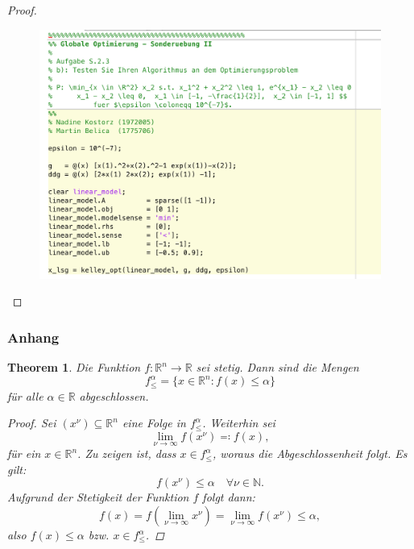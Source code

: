 \documentclass[12pt]{extreport} %
\newcommand{\N}{\mathbb{N}}
\newcommand{\R}{\mathbb{R}}
\theoremstyle{named}
\theoremstyle{nnamed}
\theoremstyle{itshape}
\theoremstyle{normal}
\newtheorem*{theorem}{Theorem}
\begin{document}
\begin{enumerate}
\begin{proof}
			\begin{figure}[h!] \centering \includegraphics[scale=0.51]{img/scr} \label{fig:sub2}\end{figure} 
		\end{proof}
\end{enumerate} 

\newpage

\subsubsection{Anhang}
 

\begin{theorem}
 	 Die Funktion $f \colon \R^n \rightarrow \R$ sei stetig. Dann sind die Mengen 
 	 	$$ f^\alpha_\leq = \{ x \in \R^n \colon f(x) \leq \alpha\} $$
 	 für alle $\alpha \in \R$ abgeschlossen.
 	 
	\begin{proof}
 		Sei $(x^\nu) \subseteq \R^n$ eine Folge in $f_\leq^\alpha$. Weiterhin sei
 			$$ \lim_{\nu \rightarrow \infty} f(x^\nu) \eqqcolon f(x), $$
 			für ein $x \in \R^n$. Zu zeigen ist, dass $x \in f_\leq^\alpha$, woraus die Abgeschlossenheit folgt. Es gilt:
 			$$ f(x^\nu) \leq \alpha \quad \forall \nu \in \N. $$
 		Aufgrund der Stetigkeit der Funktion $f$ folgt dann:
 			$$ f(x) = f(\lim_{\nu \rightarrow \infty} x^\nu) = \lim_{\nu \rightarrow \infty} f(x^\nu) \leq \alpha, $$
 		also $f(x) \leq \alpha$ bzw. $x \in f_\leq^\alpha$.
	\end{proof}
\end{theorem}

 
 
 
\end{document}
